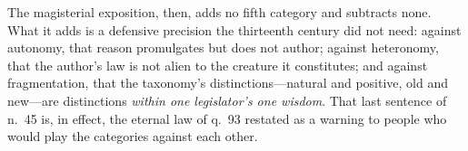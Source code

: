 The magisterial exposition, then, adds no fifth category and subtracts none. What it adds is a defensive precision the thirteenth century did not need: against autonomy, that reason promulgates but does not author; against heteronomy, that the author's law is not alien to the creature it constitutes; and against fragmentation, that the taxonomy's distinctions---natural and positive, old and new---are distinctions \emph{within one legislator's one wisdom}. That last sentence of n.~45 is, in effect, the eternal law of q.~93 restated as a warning to people who would play the categories against each other.
